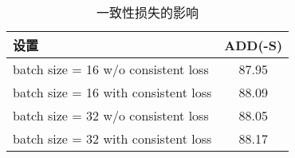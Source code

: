\begin{table}
    \centering
    \caption{一致性损失的影响}
    \begin{tabular}{lc}
    \toprule 
    设置 & ADD(-S) \\
    \midrule
    batch size = 16 w/o consistent loss & 87.95 \\
    batch size = 16 with consistent loss & 88.09 \\
    \midrule
    batch size = 32 w/o consistent loss & 88.05 \\
    batch size = 32 with consistent loss & 88.17 \\
    \bottomrule
  \end{tabular}
  \label{tab:consistent_loss}
\end{table}